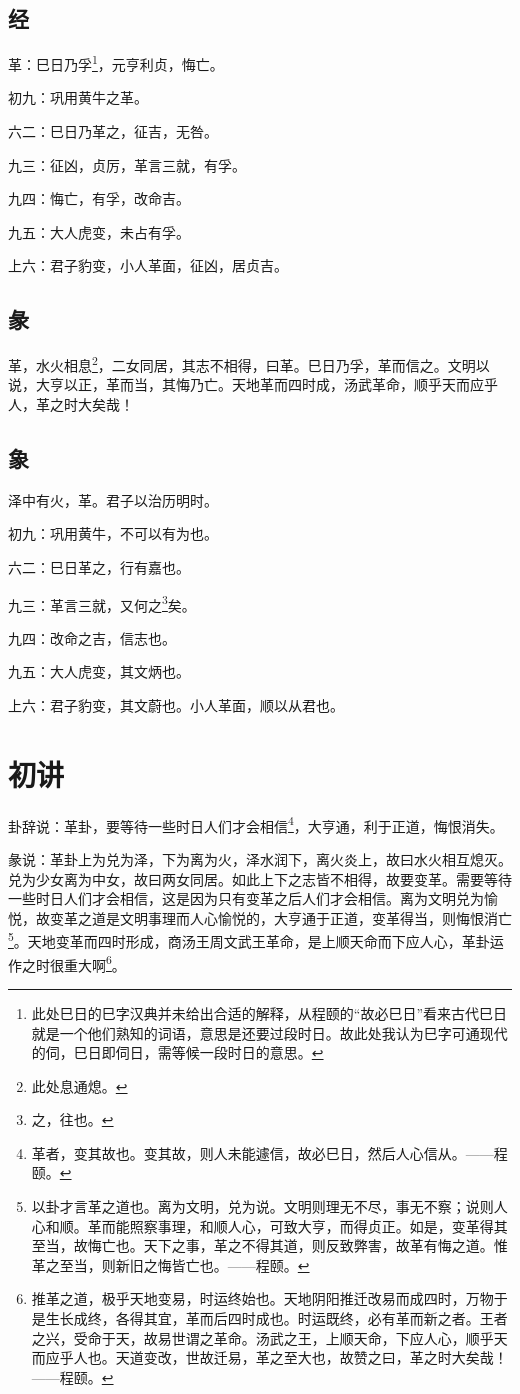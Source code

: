 \documentclass[12pt,oneside]{book}
\begin{document}
\subsection{经}
革：巳日乃孚\footnote{此处巳日的巳字汉典并未给出合适的解释，从程颐的“故必巳日”看来古代巳日就是一个他们熟知的词语，意思是还要过段时日。故此处我认为巳字可通现代的伺，巳日即伺日，需等候一段时日的意思。}，元亨利贞，悔亡。

初九：巩用黄牛之革。

六二：巳日乃革之，征吉，无咎。

九三：征凶，贞厉，革言三就，有孚。

九四：悔亡，有孚，改命吉。

九五：大人虎变，未占有孚。

上六：君子豹变，小人革面，征凶，居贞吉。

\subsection{彖}
革，水火相息\footnote{此处息通熄。}，二女同居，其志不相得，曰革。巳日乃孚，革而信之。文明以说，大亨以正，革而当，其悔乃亡。天地革而四时成，汤武革命，顺乎天而应乎人，革之时大矣哉！

\subsection{象}
泽中有火，革。君子以治历明时。

初九：巩用黄牛，不可以有为也。

六二：巳日革之，行有嘉也。

九三：革言三就，又何之\footnote{之，往也。}矣。

九四：改命之吉，信志也。

九五：大人虎变，其文炳也。

上六：君子豹变，其文蔚也。小人革面，顺以从君也。

\section{初讲}
卦辞说：革卦，要等待一些时日人们才会相信\footnote{革者，变其故也。变其故，则人未能遽信，故必巳日，然后人心信从。——程颐。}，大亨通，利于正道，悔恨消失。

彖说：革卦上为兑为泽，下为离为火，泽水润下，离火炎上，故曰水火相互熄灭。兑为少女离为中女，故曰两女同居。如此上下之志皆不相得，故要变革。需要等待一些时日人们才会相信，这是因为只有变革之后人们才会相信。离为文明兑为愉悦，故变革之道是文明事理而人心愉悦的，大亨通于正道，变革得当，则悔恨消亡\footnote{以卦才言革之道也。离为文明，兑为说。文明则理无不尽，事无不察；说则人心和顺。革而能照察事理，和顺人心，可致大亨，而得贞正。如是，变革得其至当，故悔亡也。天下之事，革之不得其道，则反致弊害，故革有悔之道。惟革之至当，则新旧之悔皆亡也。——程颐。}。天地变革而四时形成，商汤王周文武王革命，是上顺天命而下应人心，革卦运作之时很重大啊\footnote{推革之道，极乎天地变易，时运终始也。天地阴阳推迁改易而成四时，万物于是生长成终，各得其宜，革而后四时成也。时运既终，必有革而新之者。王者之兴，受命于天，故易世谓之革命。汤武之王，上顺天命，下应人心，顺乎天而应乎人也。天道变改，世故迁易，革之至大也，故赞之曰，革之时大矣哉！——程颐。}。
\end{document}
